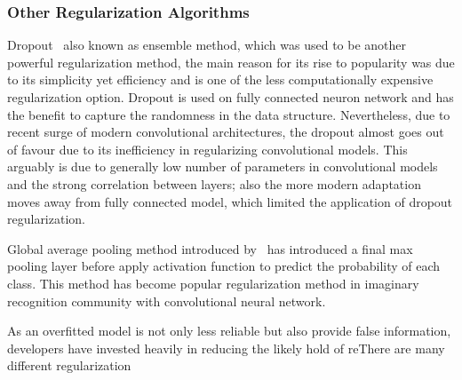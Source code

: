 \subsubsection{Other Regularization Algorithms}

Dropout~\cite{JMLR:v15:srivastava14a} also known as ensemble method, which was used to be another powerful regularization method, the main reason for its rise to popularity was due to its simplicity yet efficiency and is one of the less computationally expensive regularization option. Dropout is used on fully connected neuron network and has the benefit to capture the randomness in the data structure. Nevertheless, due to recent surge of modern convolutional architectures, the dropout almost goes out of favour due to its inefficiency in regularizing convolutional models. This arguably is due to generally low number of parameters in convolutional models and the strong correlation between layers; also the more modern adaptation moves away from fully connected model, which limited the application of dropout regularization. 
\par 
Global average pooling method introduced by~\citet{LinCY13} has introduced a final max pooling layer before apply activation function to predict the probability of each class. This method has become popular regularization method in imaginary recognition community with convolutional neural network. 
\par 
As an overfitted model is not only less reliable but also provide false information, developers have invested heavily in reducing the likely hold of   reThere are many different regularization 